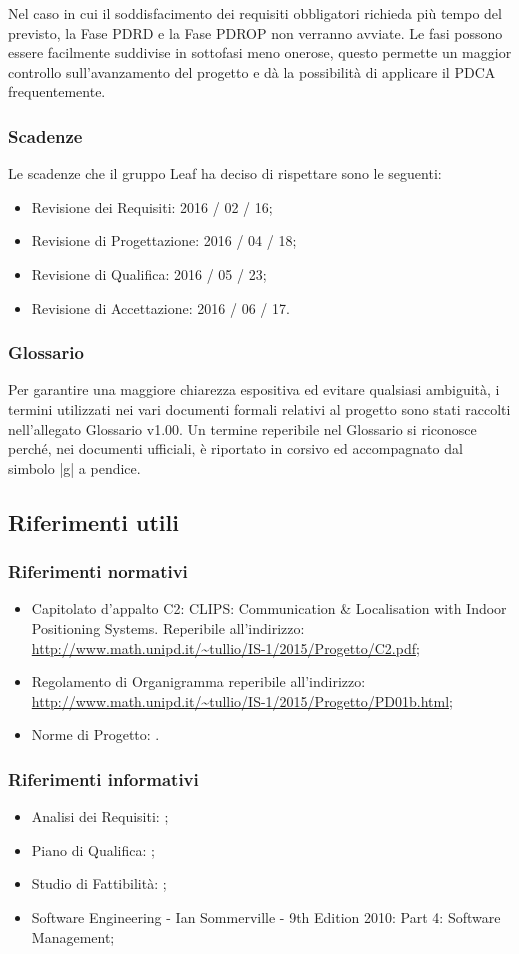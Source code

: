 \documentclass[../introduzione.tex]{subfiles}
\begin{document}
		Nel caso in cui il soddisfacimento dei requisiti obbligatori richieda più tempo del previsto, la Fase PDRD e la Fase PDROP non verranno avviate.
		Le fasi possono essere facilmente suddivise in sottofasi meno onerose, questo permette un maggior controllo sull’avanzamento del progetto e dà la possibilità di applicare il PDCA frequentemente.

		\subsubsection{Scadenze}
		Le scadenze che il gruppo Leaf  ha deciso di rispettare sono le seguenti:
		\begin{itemize}
		\item Revisione dei Requisiti: 2016 / 02 / 16;
		\item Revisione di Progettazione: 2016 / 04 / 18;
		\item Revisione di Qualifica: 2016 / 05 / 23;
		\item Revisione di Accettazione: 2016 / 06 / 17.
		\end{itemize}


		\subsubsection{Glossario}
		Per garantire una maggiore chiarezza espositiva ed evitare qualsiasi ambiguità, i termini utilizzati nei vari documenti formali relativi al progetto sono stati raccolti nell’allegato Glossario v1.00. 
		Un termine reperibile nel Glossario si riconosce perché, nei documenti ufficiali, è riportato in corsivo ed accompagnato dal simbolo |g| a pendice.


	\subsection{Riferimenti utili}

		\subsubsection{Riferimenti normativi}
		\begin{itemize}
		\item Capitolato d’appalto C2: CLIPS: Communication \& Localisation with Indoor Positioning Systems. Reperibile all’indirizzo: \url{http://www.math.unipd.it/~tullio/IS-1/2015/Progetto/C2.pdf};
		\item Regolamento di Organigramma reperibile all’indirizzo: \url{http://www.math.unipd.it/~tullio/IS-1/2015/Progetto/PD01b.html};
		\item Norme di Progetto: .
		\end{itemize}

		\subsubsection{Riferimenti informativi}
		\begin{itemize}
		\item Analisi dei Requisiti: ;
		\item Piano di Qualifica: ;
		\item Studio di Fattibilità: ;
		\item Software Engineering - Ian Sommerville - 9th Edition 2010:  Part 4: Software Management;
		\end{itemize}
			
\end{document}

